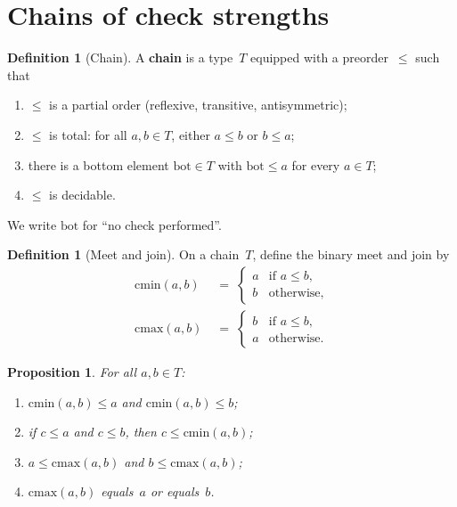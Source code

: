\documentclass[11pt,a4paper]{article}
\theoremstyle{plain}
\newtheorem{proposition}[theorem]{Proposition}
\theoremstyle{definition}
\newtheorem{definition}[theorem]{Definition}
\newcommand{\bott}{\mathrm{bot}}
\newcommand{\cmin}{\mathrm{cmin}}
\newcommand{\cmax}{\mathrm{cmax}}
\begin{document}
\section{Chains of check strengths}

\begin{definition}[Chain]\label{def:chain}
A \textbf{chain} is a type~$T$ equipped with a preorder~$\le$ such that
\begin{enumerate}
  \item $\le$ is a partial order (reflexive, transitive, antisymmetric);
  \item $\le$ is total: for all $a,b \in T$, either $a \le b$ or $b \le a$;
  \item there is a bottom element $\bott \in T$ with $\bott \le a$ for every
        $a \in T$;
  \item $\le$ is decidable.
\end{enumerate}
We write $\bott$ for ``no check performed''.
\end{definition}

\begin{definition}[Meet and join]\label{def:cmin-cmax}
On a chain~$T$, define the binary meet and join by
\begin{align}
  \cmin(a,b) &\;=\;
  \begin{cases}
    a & \text{if } a \le b, \\
    b & \text{otherwise},
  \end{cases}
  \\[4pt]
  \cmax(a,b) &\;=\;
  \begin{cases}
    b & \text{if } a \le b, \\
    a & \text{otherwise}.
  \end{cases}
\end{align}
\end{definition}

\begin{proposition}\label{prop:cmin-cmax}
For all $a,b \in T$:
\begin{enumerate}
  \item $\cmin(a,b) \le a$ and $\cmin(a,b) \le b$;
  \item if $c \le a$ and $c \le b$, then $c \le \cmin(a,b)$;
  \item $a \le \cmax(a,b)$ and $b \le \cmax(a,b)$;
  \item $\cmax(a,b)$ equals~$a$ or equals~$b$.
\end{enumerate}
\end{proposition}
\end{document}
